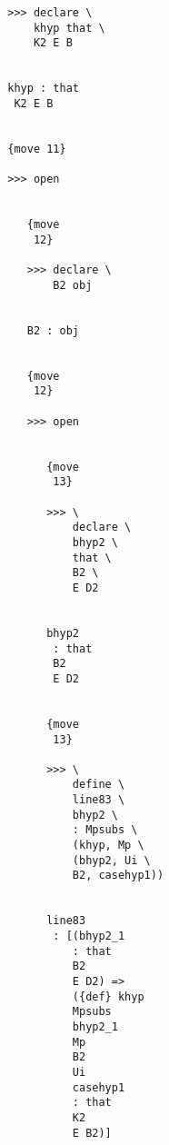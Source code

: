 \documentclass[12pt]{article}
\begin{document}
\begin{verbatim}
                                 >>> declare \
                                     khyp that \
                                     K2 E B


                                 khyp : that 
                                  K2 E B


                                 {move 11}

                                 >>> open


                                    {move 
                                     12}

                                    >>> declare \
                                        B2 obj


                                    B2 : obj


                                    {move 
                                     12}

                                    >>> open


                                       {move 
                                        13}

                                       >>> \
                                           declare \
                                           bhyp2 \
                                           that \
                                           B2 \
                                           E D2


                                       bhyp2 
                                        : that 
                                        B2 
                                        E D2


                                       {move 
                                        13}

                                       >>> \
                                           define \
                                           line83 \
                                           bhyp2 \
                                           : Mpsubs \
                                           (khyp, Mp \
                                           (bhyp2, Ui \
                                           B2, casehyp1))


                                       line83 
                                        : [(bhyp2_1 
                                           : that 
                                           B2 
                                           E D2) => 
                                           ({def} khyp 
                                           Mpsubs 
                                           bhyp2_1 
                                           Mp 
                                           B2 
                                           Ui 
                                           casehyp1 
                                           : that 
                                           K2 
                                           E B2)]



\end{verbatim}
\end{document}
